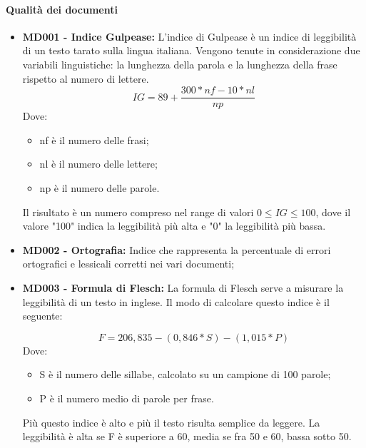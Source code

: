 \paragraph{Qualità dei documenti}
\begin{itemize}
	\item \textbf{MD001 - Indice Gulpease:} L'indice di Gulpease è un indice di leggibilità di un testo tarato sulla lingua italiana. Vengono tenute in considerazione due variabili linguistiche:  la lunghezza della parola e la lunghezza della frase rispetto al numero di lettere.
	\[ IG = 89+ \frac{300*nf - 10*nl}{np} \]
	Dove:
	\begin{itemize}
		\item nf è il numero delle frasi;
		\item nl è il numero delle lettere;
		\item np è il numero delle parole.
	\end{itemize}
	Il risultato è un numero compreso nel range di valori $0 \le{IG} \le{100}$, dove il valore "100" indica la leggibilità più alta e "0" la leggibilità più bassa.
	
	\item \textbf{MD002 - Ortografia:} Indice che rappresenta la percentuale di errori ortografici e lessicali corretti nei vari documenti;
	
	\item \textbf{MD003 - Formula di Flesch:} La formula di Flesch serve a misurare la leggibilità di un testo in inglese.
	Il modo di calcolare questo indice è il seguente:
	
	\[ F = 206,835 - (0,846*S) - (1,015*P) \]
	Dove:
	\begin{itemize}
		\item S è il numero delle sillabe, calcolato su un campione di 100 parole;
		\item P è il numero medio di parole per frase.
	\end{itemize}
Più questo indice è alto e più il testo risulta semplice da leggere. La leggibilità è alta se F è superiore a 60, media se fra 50 e 60, bassa sotto 50.
\end{itemize}

